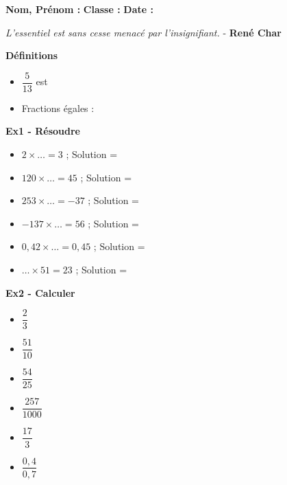 



\textbf{Nom, Prénom :} \hspace{8cm} \textbf{Classe :} \hspace{3cm} \textbf{Date :}\\

\begin{center}
  \textit{L’essentiel est sans cesse menacé par l’insignifiant.} - \textbf{René Char}
\end{center}

\textbf{Définitions}

\begin{itemize}[label={$\bullet$}]
  \item $\dfrac{5}{13}$ est \dotfill \\ \Pointilles[1] 
  \item Fractions égales : \dotfill \\ \Pointilles[1] 
\end{itemize}

\textbf{Ex1 - Résoudre}

\begin{multicols}{2}
\begin{itemize}[label={$\bullet$}]
  \item $ 2 \times \ldots = 3 $ ; Solution = \dotfill \\
  \item $ 120 \times \ldots = 45$ ; Solution = \dotfill \\
  \item $ 253 \times \ldots = -37$ ; Solution = \dotfill \\
  \item $ -137 \times \ldots = 56$ ; Solution = \dotfill \\
  \item $ 0,42 \times \ldots = 0,45$ ; Solution = \dotfill \\
  \item $ \ldots \times 51 = 23$ ; Solution = \dotfill \\
\end{itemize}
\end{multicols}

\textbf{Ex2 - Calculer}

\begin{multicols}{3}
\begin{itemize}[label={$\bullet$}]
  \item $\dfrac{2}{3}$ \dotfill \\
  \item $\dfrac{51}{10}$ \dotfill \\
  \item $\dfrac{54}{25}$ \dotfill \\
  \item $\dfrac{257}{1000}$ \dotfill \\
  \item $\dfrac{17}{3}$ \dotfill \\
  \item $\dfrac{0,4}{0,7}$ \dotfill \\
\end{itemize}
\end{multicols}

